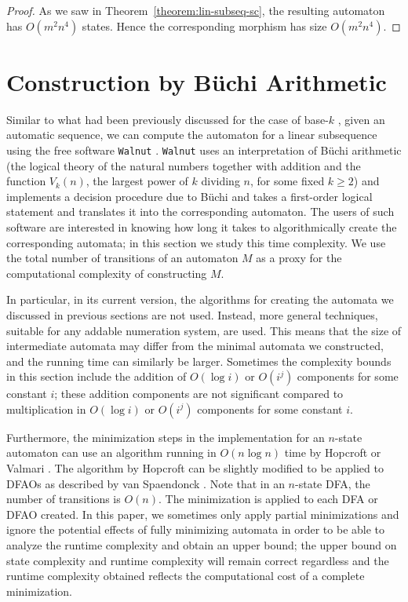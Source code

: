 \documentclass[12pt,reqno]{article}
\begin{document}
\begin{proof}
As we saw in Theorem~\ref{theorem:lin-subseq-sc}, the resulting
automaton has $O(m^2n^4)$ states. Hence the corresponding morphism
has size $O(m^2n^4)$.
\end{proof}



\section{Construction by B\"uchi Arithmetic} \label{section:Buchi}


Similar to what had been previously discussed for the case of base-$k$ \cite{moradi_complexity_2026}, given an automatic sequence, we can compute the automaton for a linear subsequence using the free software {\tt Walnut} 
\cite{mousavi_automatic_2021,shallit_logical_2023}.  {\tt Walnut} uses an interpretation of B\"uchi arithmetic (the logical theory of the natural numbers together with addition and  the function $V_k(n)$, the largest power of $k$ dividing $n$, for some fixed $k \geq 2$) and implements a 
decision procedure due to B\"uchi \cite{buchi_weak_1960,bruyere_logic_1994} and takes a first-order logical statement and translates it into the
corresponding automaton. The users of such software are interested in knowing how long it takes to algorithmically create the corresponding automata; in this section we study this time complexity. We use the total number of transitions of an automaton $M$ as a proxy for the computational complexity of constructing $M$. 

In particular, in its current version, the algorithms for creating the automata we discussed in previous sections are not used.  Instead, more general techniques, suitable for any addable numeration system, are used.  This means that the size of intermediate automata may differ from the minimal automata we constructed, and the running time can similarly be larger. Sometimes the complexity bounds in this section include the addition of $O(\log i)$ or $O(i^j)$ components for some constant $i$; these addition components are not significant compared to multiplication in $O(\log i)$ or $O(i^j)$ components for some constant $i$.

Furthermore, the minimization steps in the implementation for an $n$-state automaton can use an algorithm running in $O(n \log n)$ time  by Hopcroft \cite{hopcroft_n_1971} or Valmari \cite{valmari_fast_2012}. The algorithm by Hopcroft can be slightly modified to be applied to DFAOs as described by van Spaendonck \cite{van_spaendonck_automatic_2020}. Note that in an $n$-state DFA, the number of transitions is $O(n)$.  
The minimization is applied to each DFA or DFAO created. In this paper, we sometimes only apply partial minimizations and ignore the potential effects of fully minimizing automata in order to be able to analyze the runtime complexity and obtain an upper bound; the upper bound on state complexity and runtime complexity will remain correct regardless and the runtime complexity obtained reflects the computational cost of a complete minimization.
\end{document}
